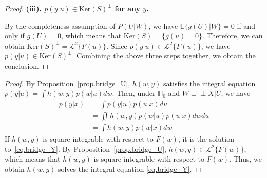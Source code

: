 \documentclass[
  12pt]{article}
\newcommand{\ind}{\perp\!\!\!\!\perp}
\def\cL{\mathcal{L}}
\begin{document}
\begin{proof}
\noindent\textbf{(iii). $p(y|u)\in \mathrm{Ker}(S)^{\perp}$ for any $y$.}

By the completeness assumption of $P(U|W)$, we have $\mathbb{E}\{g(U)|W\}=0$ if and only if $g(U)=0$, which means that $\mathrm{Ker}(S)=\{g(u)=0\}$. Therefore, we can obtain $\mathrm{Ker}(S)^{\perp}=\mathcal{L}^2\{F(u)\}$. Since $p(y|u)\in \mathcal{L}^2\{F(u)\}$, we have $p(y|u)\in \mathrm{Ker}(S)^{\perp}$. Combining the above three steps together, we obtain the conclusion.
\end{proof}

\solutionsexist*
\begin{proof}
    By Proposition~\ref{prop.bridge_U}, $h(w,y)$ satisfies the integral equation $ p(y|u) =\int{h(w,y) p(w|u) dw}$. Then, under $\mathbb{H}_0$ and $W\ind X|U$, we have
    \begin{align*}
    	p(y|x) &=\int{p(y|u) p(u|x) du}\\
    	&=\iint{ h(w,y) p(w|u)   p(u|x) dwdu}\\
        &= \int h(w,y)p(w|x)dw
    \end{align*}
   If $h(w,y)$ is square integrable with respect to $F(w)$, it is the solution to~\eqref{eq.bridge_Y}.  By Proposition~\ref{prop.bridge_U}, $h(w,y)\in \cL^2\{F(w)\}$, which means that $h(w,y)$ is square integrable with
respect to $F(w)$. Thus, we obtain $h(w,y)$ solves the integral equation \eqref{eq.bridge_Y}.
\end{proof}
\end{document}

